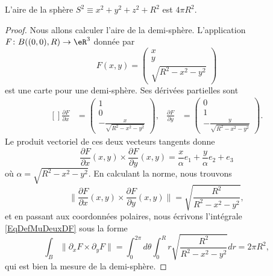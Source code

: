 \begin{proposition}	\label{PROPooAFGSooJBZiuo}
	L'aire de la sphère \( S^2\equiv x^2+y^2+z^2+R^2\) est \( 4\pi R^2\).
\end{proposition}

\begin{proof}
	Nous allons calculer l'aire de la demi-sphère. L'application \( F\colon B( (0,0),R)\to \eR^3\) donnée par
	\begin{equation}
		F(x,y)=\begin{pmatrix}
			x \\
			y \\
			\sqrt{R^2-x^2-y^2}
		\end{pmatrix}
	\end{equation}
	est une carte pour une demi-sphère. Ses dérivées partielles sont
	\begin{equation}
		\begin{aligned}[]
			\frac{ \partial F }{ \partial x } & =\begin{pmatrix}
				                                     1 \\
				                                     0 \\
				                                     -\frac{ x }{ \sqrt{R^2-x^2-y^2} }
			                                     \end{pmatrix},
			                                  & \frac{ \partial F }{ \partial y }      & =\begin{pmatrix}
				                                                                              0 \\
				                                                                              1 \\
				                                                                              -\frac{ y }{ \sqrt{R^2-x^2-y^2} }
			                                                                              \end{pmatrix}.
		\end{aligned}
	\end{equation}
	Le produit vectoriel de ces deux vecteurs tangents donne
	\begin{equation}
		\frac{ \partial F }{ \partial x }(x,y)\times\frac{ \partial F }{ \partial y }(x,y)=\frac{ x }{ \alpha }e_1+\frac{ y }{ \alpha }e_2+e_3
	\end{equation}
	où \( \alpha=\sqrt{R^2-x^2-y^2}\). En calculant la norme, nous trouvons
	\begin{equation}
		\| \frac{ \partial F }{ \partial x }(x,y)\times\frac{ \partial F }{ \partial y }(x,y)\| =\sqrt{  \frac{ R^2 }{ R^2-x^2-y^2 } },
	\end{equation}
	et en passant aux coordonnées polaires, nous écrivons l'intégrale \eqref{EqDefMuDeuxDF} sous la forme
	\begin{equation}        \label{EQooYGRFooKwEYfV}
		\int_B\| \partial_xF\times\partial_yF \|=\int_0^{2\pi}d\theta\int_0^R r\sqrt{  \frac{ R^2 }{ R^2-x^2-y^2 } }dr=2\pi R^2,
	\end{equation}
	qui est bien la mesure de la demi-sphère.
\end{proof}

